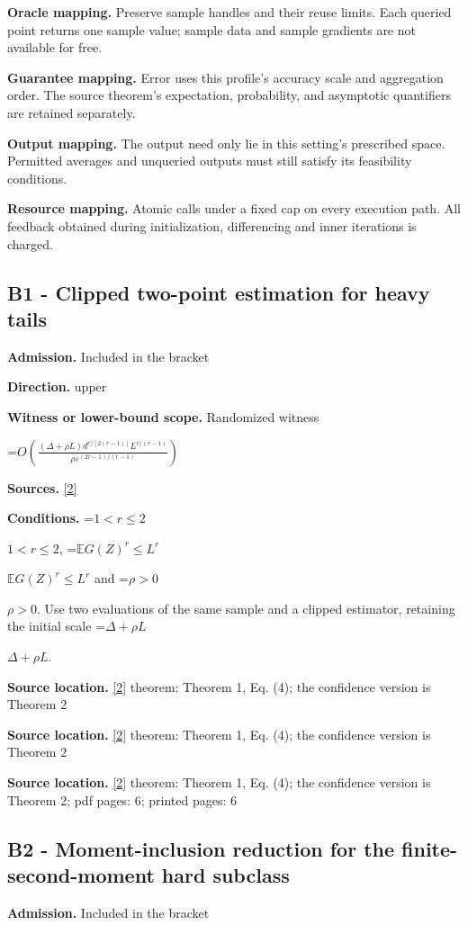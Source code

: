 \documentclass[10pt,a4paper]{article}
\newcommand{\AtlasMath}[1]{\par\begingroup\centering\setbox0=\hbox{$\displaystyle #1$}\ifdim\wd0>1.4\linewidth\typeout{ATLAS WIDE FORMULA: \the\wd0}\fi\ifdim\wd0>\linewidth\resizebox{\linewidth}{!}{\box0}\else\box0\fi\par\endgroup}
\newcommand{\AtlasInlineMath}[1]{\begingroup\setbox0=\hbox{$#1$}\ifdim\wd0>.4\linewidth\endgroup\AtlasMath{#1}\else\endgroup$#1$\fi}
\begin{document}
\textbf{Oracle mapping.} Preserve sample handles and their reuse limits. Each queried point returns one sample value; sample data and sample gradients are not available for free.

\textbf{Guarantee mapping.} Error uses this profile's accuracy scale and aggregation order. The source theorem's expectation, probability, and asymptotic quantifiers are retained separately.

\textbf{Output mapping.} The output need only lie in this setting's prescribed space. Permitted averages and unqueried outputs must still satisfy its feasibility conditions.

\textbf{Resource mapping.} Atomic calls under a fixed cap on every execution path. All feedback obtained during initialization, differencing and inner iterations is charged.

\subsection{B1 - Clipped two-point estimation for heavy tails}
\textbf{Admission.} Included in the bracket

\textbf{Direction.} upper

\textbf{Witness or lower-bound scope.} Randomized witness

\AtlasMath{O\!\left(\frac{(\Delta+\rho L)d^{r/[2(r-1)]}L^{r/(r-1)}}{\rho\varepsilon^{(2r-1)/(r-1)}}\right)}
\textbf{Sources.} \href{https://arxiv.org/html/2605.24513v1}{[2]}

\textbf{Conditions.} \AtlasInlineMath{1<r\le2}, \AtlasInlineMath{\mathbb{E} G(Z)^r\le L^r} and \AtlasInlineMath{\rho>0}. Use two evaluations of the same sample and a clipped estimator, retaining the initial scale \AtlasInlineMath{\Delta+\rho L}.

\textbf{Source location.} \href{https://arxiv.org/html/2605.24513v1}{[2]} theorem: Theorem 1, Eq. (4); the confidence version is Theorem 2

\textbf{Source location.} \href{https://arxiv.org/html/2605.24513v1}{[2]} theorem: Theorem 1, Eq. (4); the confidence version is Theorem 2

\textbf{Source location.} \href{https://arxiv.org/html/2605.24513v1}{[2]} theorem: Theorem 1, Eq. (4); the confidence version is Theorem 2; pdf pages: 6; printed pages: 6

\subsection{B2 - Moment-inclusion reduction for the finite-second-moment hard subclass}
\textbf{Admission.} Included in the bracket
\end{document}
